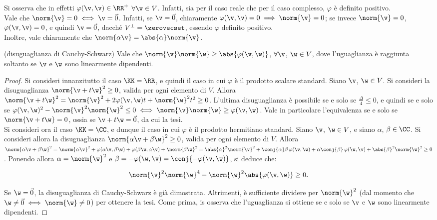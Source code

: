 \documentclass[11pt]{article}
\begin{document}
	\begin{remark}\nl
		\li Si osserva che in effetti $\varphi(\v, \v) \in \RR^+$ $\forall \v \in V$. Infatti, sia
		per il caso reale che per il caso complesso, $\varphi$ è definito positivo. \\
		\li Vale che $\norm{\v} = 0 \iff \v = \vec 0$. Infatti, se $\v = \vec 0$, chiaramente
		$\varphi(\v, \v) = 0 \implies \norm{\v} = 0$; se invece $\norm{\v} = 0$,
		$\varphi(\v, \v) = 0$, e quindi $\v = \vec 0$, dacché $V^\perp = \zerovecset$, essendo
		$\varphi$ definito positivo. \\
		\li Inoltre, vale chiaramente che $\norm{\alpha \v} = \abs{\alpha} \norm{\v}$.
	\end{remark}

	\begin{proposition} (disuguaglianza di Cauchy-Schwarz)
		Vale che $\norm{\v} \norm{\w} \geq \abs{\varphi(\v, \w)}$, $\forall \v$, $\w \in V$, dove
		l'uguaglianza è raggiunta soltanto se $\v$ e $\w$ sono linearmente dipendenti.
	\end{proposition}

	\begin{proof}
		Si consideri innanzitutto il caso $\KK = \RR$, e quindi il caso in cui $\varphi$ è
		il prodotto scalare standard. Siano $\v$, $\w \in V$.
		Si consideri la disuguaglianza $\norm{\v + t\w}^2 \geq 0$, valida
		per ogni elemento di $V$. Allora $\norm{\v + t \w}^2 = \norm{\v}^2 + 2 \varphi(\v, \w) t + \norm{\w}^2 t^2 \geq 0$. L'ultima disuguaglianza è possibile se e solo se $\frac{\Delta}{4} \leq 0$, e quindi se e solo
		se $\varphi(\v, \w)^2 - \norm{\v}^2 \norm{\w}^2 \leq 0 \iff \norm{\v} \norm{\w} \geq \varphi(\v, \w)$.
		Vale in particolare l'equivalenza se e solo se $\norm{\v + t\w} = 0$, ossia se $\v + t\w = \vec 0$, da cui
		la tesi. \\
		
		Si consideri ora il caso $\KK = \CC$, e dunque il caso in cui $\varphi$ è il prodotto hermitiano
		standard. Siano $\v$, $\w \in V$, e siano $\alpha$, $\beta \in \CC$. Si consideri allora
		la disuguaglianza $\norm{\alpha \v + \beta \w}^2 \geq 0$, valida per ogni elemento di $V$. Allora
		$\norm{\alpha \v + \beta \w}^2 = \norm{\alpha \v}^2 + \varphi(\alpha \v, \beta \w) + \varphi(\beta \w, \alpha \v) + \norm{\beta \w}^2 = \abs{\alpha}^2 \norm{\v}^2 + \conj{\alpha} \beta \, \varphi(\v, \w) +
		\alpha \conj{\beta} \, \varphi(\w, \v) + \abs{\beta}^2 \norm{\w}^2 \geq 0$. Ponendo allora
		$\alpha = \norm{\w}^2$ e $\beta = -\varphi(\w, \v) = \conj{-\varphi(\v, \w)}$, si deduce che:
		
		\[ \norm{\v}^2 \norm{\w}^4 - \norm{\w}^2 \abs{\varphi(\v, \w)} \geq 0. \]
		
		\vskip 0.05in
		
		Se $\w = \vec 0$, la disuguaglianza di Cauchy-Schwarz è già dimostrata. Altrimenti, è sufficiente
		dividere per $\norm{\w}^2$ (dal momento che $\w \neq \vec 0 \iff \norm{\w} \neq 0$) per ottenere
		la tesi. Come prima, is osserva che l'uguaglianza si ottiene se e solo se $\v$ e $\w$ sono
		linearmente dipendenti.
	\end{proof}
\end{document}
